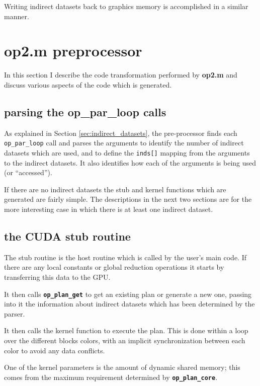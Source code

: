 \documentclass[12pt]{article}
\begin{document}
Writing indirect datasets back to graphics memory is accomplished in a 
similar manner.

\newpage

\section{op2.m preprocessor}

In this section I describe the code transformation performed by
{\bf op2.m} and discuss various aspects of the code which is generated.

\subsection{parsing the op\_par\_loop calls}

As explained in Section \ref{sec:indirect_datasets}, the pre-processor 
finds each {\tt op\_par\_loop} call 
and parses the arguments to identify the number of indirect 
datasets which are used, and to define the {\tt inds[]} mapping 
from the arguments to the indirect datasets.  It also identifies 
how each of the arguments is being used (or ``accessed'').

If there are no indirect datasets the stub and kernel functions
which are generated are fairly simple.  The descriptions in the next 
two sections are for the more interesting case in which there is
at least one indirect dataset.

\subsection{the CUDA stub routine}

The stub routine is the host routine which is called by the user's 
main code.  If there are any local constants or global reduction 
operations it starts by transferring this data to the GPU.

It then calls {\tt \bf op\_plan\_get} to get an existing plan or 
generate a new one, passing into it the information about indirect 
datasets which has been determined by the parser.

It then calls the kernel function to execute the plan.  This is 
done within a loop over the different blocks colors, with an
implicit synchronization between each color to avoid any data 
conflicts.

One of the kernel parameters is the amount of dynamic shared 
memory; this comes from the maximum requirement determined 
by {\tt \bf op\_plan\_core}.
\end{document}
